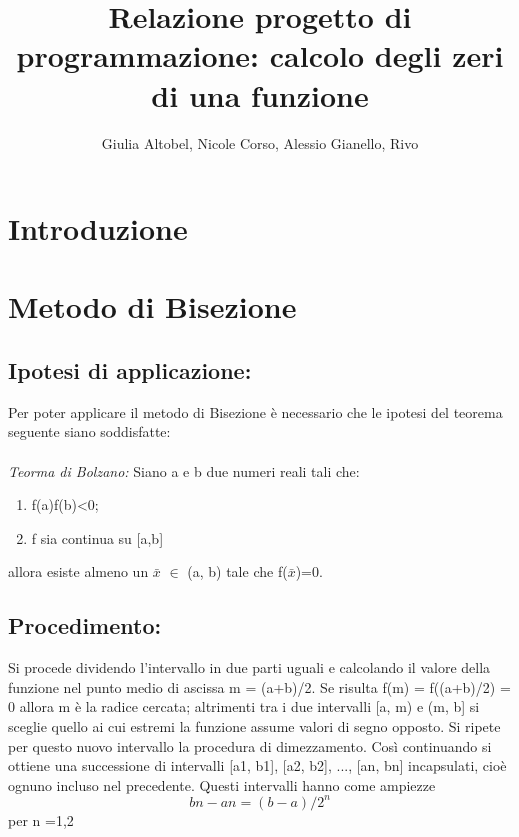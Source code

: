 \documentclass[a4paper,11pt]{article}
\begin{document}
\title{Relazione progetto di programmazione: calcolo degli zeri di una funzione }
\author{Giulia Altobel, Nicole Corso, Alessio Gianello, Rivo  }


\maketitle
 \section {Introduzione}




\section{Metodo di Bisezione}
\subsection{Ipotesi di applicazione:}

Per  poter applicare il metodo di Bisezione è necessario che le ipotesi del teorema seguente siano soddisfatte: 
\\
\\
 \textit{Teorma di Bolzano:}
Siano a e b due numeri reali tali che:

\begin{enumerate}
\item  f(a)f(b)<0;
\item  f sia continua su [a,b]
\end{enumerate}	

allora esiste almeno un $\bar{x}$ $\in$  (a, b) tale che f($\bar{x}$)=0.
\\
\subsection{Procedimento:}
Si procede dividendo l'intervallo in due parti uguali e calcolando il valore della funzione nel punto medio di ascissa m = (a+b)/2.
Se risulta f(m) = f((a+b)/2) = 0 allora m è la radice cercata; altrimenti tra i due intervalli [a, m) e (m, b] si sceglie quello ai cui estremi la funzione  assume 	valori di segno opposto. Si ripete per questo  nuovo intervallo la procedura di dimezzamento.
Così continuando si ottiene una successione di intervalli [a1, b1], [a2, b2], ..., [an, bn] incapsulati, cioè ognuno incluso nel precedente. Questi intervalli hanno come ampiezze
\begin{equation} bn - an = (b-a) / 2^n  \end {equation}per n =1,2
\end{document}

